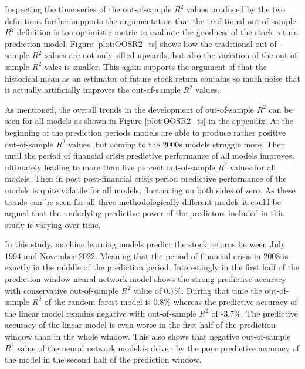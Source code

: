 \documentclass[12pt]{article}
\begin{document}
Inspecting the time series of the out-of-sample $R^2$ values produced by the two definitions further supports the argumentation that the traditional out-of-sample $R^2$ definition is too optimistic metric to evaluate the goodness of the stock return prediction model. Figure \ref{plot:OOSR2_ts} shows how the traditional out-of-sample $R^2$ values are not only sifted upwards, but also the variation of the out-of-sample $R^2$ vales is smaller. This again supports the argument of \citet{guetal} that the historical mean as an estimator of future stock return contains so much noise that it actually artificially improves the out-of-sample $R^2$ values.\footnotemark {}  \par

As mentioned, the overall trends in the development of out-of-sample $R^2$ can be seen for all models as shown in Figure \ref{plot:OOSR2_ts} in the appendix. At the beginning of the prediction periods models are able to produce rather positive out-of-sample $R^2$ values, but coming to the 2000s models struggle more. Then until the period of financial crisis predictive performance of all models improves, ultimately leading to more than five percent out-of-sample $R^2$ values for all models. Then in post post-financial crisis period predictive performance of the models is quite volatile for all models, fluctuating on both sides of zero. As these trends can be seen for all three methodologically different models it could be argued that the underlying predictive power of the predictors included in this study is varying over time. \par

In this study, machine learning models predict the stock returns between July 1994 and November 2022. Meaning that the period of financial crisis in 2008 is exactly in the middle of the prediction period. Interestingly in the first half of the prediction window neural network model shows the strong predictive accuracy with conservative out-of-sample $R^2$ value of 0.7\%. During that time the out-of-sample $R^2$ of the random forest model is 0.8\% whereas the predictive accuracy of the linear model remains negative with out-of-sample $R^2$ of -3.7\%. The predictive accuracy of the linear model is even worse in the first half of the prediction window than in the whole window. This also shows that negative out-of-sample $R^2$ value of the neural network model is driven by the poor predictive accuracy of the model in the second half of the prediction window. \par
\end{document}
